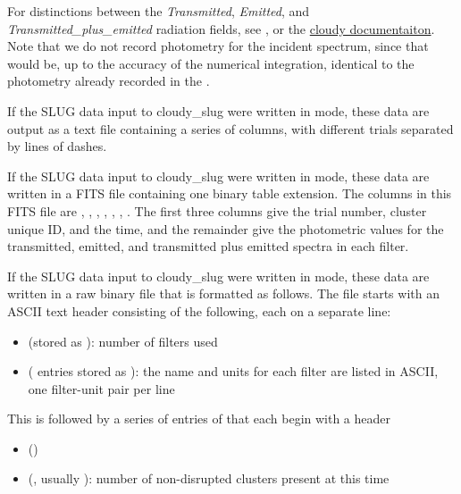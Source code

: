 \documentclass[letterpaper,10pt,english]{sphinxmanual}
\begin{document}
For distinctions between the \emph{Transmitted}, \emph{Emitted}, and
\emph{Transmitted\_plus\_emitted} radiation fields, see
{\hyperref[cloudy:sssec-int-cloudyspec-file]{\emph{}}}, or the \href{http://nublado.org}{cloudy documentaiton}. Note that we do not record photometry for the
incident spectrum, since that would be, up to the accuracy of the
numerical integration, identical to the photometry already recorded in
the {\hyperref[output:ssec-cluster-phot-file]{\emph{}}}.

If the SLUG data input to cloudy\_slug were written in  mode,
these data are output as a text file containing a series of columns,
with different trials separated by lines of dashes.

If the SLUG data input to cloudy\_slug were written in  mode,
these data are written in a FITS file containing one binary table
extension. The columns in this FITS file are , ,
, , ,
, . The first three columns
give the trial number, cluster unique ID, and the time, and the
remainder give the photometric values for the transmitted, emitted,
and transmitted plus emitted spectra in each filter.

If the SLUG data input to cloudy\_slug were written in  mode,
these data are written in a raw binary file that is formatted as
follows. The file starts with an ASCII text header consisting of the
following, each on a separate line:
\begin{itemize}
\item {} 
 (stored as ): number of filters used

\item {} 
  ( entries stored as ): the name and units for each filter are listed in ASCII, one
filter-unit pair per line

\end{itemize}

This is followed by a series of entries of that each begin with a
header
\begin{itemize}
\item {} 
 ()

\item {} 
 (, usually ): number of non-disrupted clusters present at this time

\end{itemize}
\end{document}
